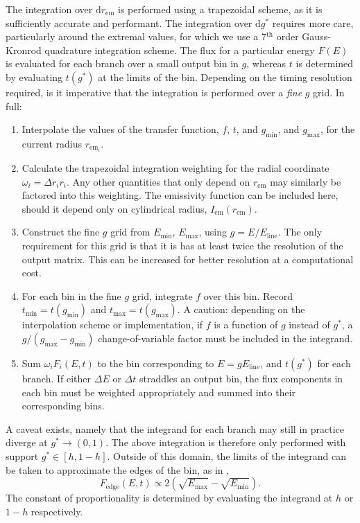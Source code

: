 \documentclass[fleqn,usenatbib]{mnras}
\renewcommand{\d}{\text{d}}
\newcommand{\rhoem}{r_\text{em}}
\begin{document}
The integration over $\d \rhoem$ is performed using a trapezoidal scheme, as it
is sufficiently accurate and performant. The integration over $\d g^\ast$
requires more care, particularly around the extremal values, for which we use a
7$^\text{th}$ order Gauss-Kronrod quadrature integration scheme. The flux for a
particular energy $F(E)$ is evaluated for each branch over a small output bin in
$g$, whereas $t$ is determined by evaluating $t(g^\ast)$ at the limits of the
bin. Depending on the timing resolution required, is it imperative that the
integration is performed over a \emph{fine} $g$ grid. In full:
\begin{enumerate}
    \item Interpolate the values of the transfer function, $f$, $t$, and
        $g_\text{min}$, and $g_\text{max}$, for the current radius $\rhoem_i$.
    \item Calculate the trapezoidal integration weighting for the radial
        coordinate $\omega_i = \Delta r_i r_i$. Any other quantities that only
        depend on $\rhoem$ may similarly be factored into this weighting. The
        emissivity function can be included here, should it depend only on
        cylindrical radius, $I_\text{em}(\rhoem)$.
    \item Construct the fine $g$ grid from $E_\text{min}$, $E_\text{max}$, using
        $g = E / E_\text{line}$. The only requirement for this grid is that it
        is has at least twice the resolution of the output matrix. This can be
        increased for better resolution at a computational cost.
    \item For each bin in the fine $g$ grid, integrate $f$ over this bin. Record
        $t_\text{min} = t(g_\text{min})$ and $t_\text{max} = t(g_\text{max})$.
        A caution: depending on the interpolation scheme or implementation, if
        $f$ is a function of $g$ instead of $g^\ast$, a $g / (g_\text{max} -
        g_\text{min})$ change-of-variable factor must be included in the
        integrand.
    \item Sum $\omega_i F_i(E, t)$ to the bin corresponding to $E =
        gE_\text{line}$, and $t(g^\ast)$ for each branch. If either $\Delta E$
        or $\Delta t$ straddles an output bin, the flux components in each bin
        must be weighted appropriately and summed into their corresponding bins.
\end{enumerate}

A caveat exists, namely that the integrand for each branch may still in practice
diverge at $g^\ast \rightarrow (0, 1)$. The above integration is therefore only
performed with support $g^\ast \in [h, 1 - h]$. Outside of this domain, the
limits of the integrand can be taken to approximate the edges of the bin, as in
\cite{dauser_broad_2010},
\begin{equation}
    F_\text{edge}(E,t) \propto 2\left( \sqrt{E_\text{max}} - \sqrt{E_\text{min}} \right).
\end{equation}
The constant of proportionality is determined by evaluating the integrand at $h$
or $1 - h$ respectively.
\end{document}
